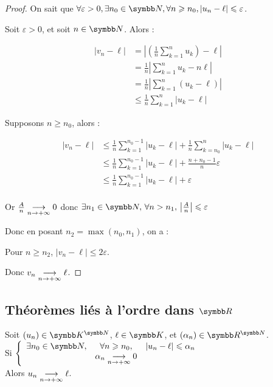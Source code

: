 \begin{proof}
    On sait que $\forall \varepsilon > 0, \exists n_0 \in \N, \forall n \geqslant n_0, |u_n - \ell| \leqslant \varepsilon$.

    Soit $\varepsilon > 0$, et soit $n \in \N$. Alors : 

    \begin{align*}
        |v_n - \ell| &= \left| \left(\frac{1}{n} \sum_{k=1}^n u_k\right) - \ell \right| \\
        &= \frac{1}{n} \left| \sum_{k=1}^n u_k - n \ell \right| \\
        &= \frac{1}{n} \left| \sum_{k=1}^n (u_k - \ell) \right| \\
        &\leqslant \frac{1}{n} \sum_{k=1}^n |u_k - \ell|
    \end{align*}
    

    Supposons $n \geqslant n_0$, alors :

    \begin{align*}
        |v_n - \ell| & \leqslant  \frac 1 n \sum_{k=1}^{n_0 - 1} |u_k - \ell| + \frac 1 n \sum_{k=n_0}^n |u_k - \ell| \\
        & \leqslant  \frac 1 n \sum_{k=1}^{n_0 - 1} |u_k - \ell| + \frac {n + n_0 - 1} n \varepsilon \\
        & \leqslant  \frac 1 n \sum_{k=1}^{n_0 - 1} |u_k - \ell| + \varepsilon \\
    \end{align*}

    Or $\frac A n \underset{n \to +\infty}{\longrightarrow} 0$ donc $\exists n_1 \in \N, \, \forall n > n_1, \, \left| \frac A n \right| \leqslant \varepsilon $

    Donc en posant $n_2 = \max(n_0, n_1)$, on a : 

    Pour $n \geqslant n_2$, $|v_n - \ell| \leqslant 2\varepsilon$. 

    Donc $v_n \underset{n \to +\infty}{\longrightarrow} \ell$.
\end{proof}

\subsection{Théorèmes liés à l'ordre dans \texorpdfstring{$\R$}{R}}
\begin{theoreme}{}{}
    Soit $(u_n) \in \K^{\N}$, $\ell \in \K$, et $(\alpha_n) \in \R^{\N}$. \\
    
    Si $\left\{ \begin{array}{lcl}
        \exists n_0 \in \N, & \forall n \geqslant n_0, & |u_n - \ell|\leqslant \alpha_n \\
        \space & \alpha_n \limit{n}{+\infty} 0 & \space \\
    \end{array} \right.
    $ \\

    Alors $u_n \underset{n \to +\infty}{\longrightarrow} \ell$.
\end{theoreme}

